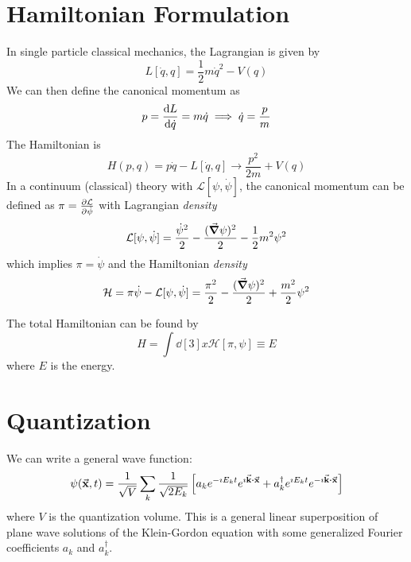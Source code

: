 \documentclass[a4paper,twoside,master.tex]{subfiles}
\begin{document}

\section{Hamiltonian Formulation}\label{sec:hamiltonian_formulation}

In single particle classical mechanics, the Lagrangian is given by
\begin{equation}
    L[\dot{q}, q] = \frac{1}{2} m\dot{q}^2 - V(q)
\end{equation}
We can then define the canonical momentum as
\begin{equation}
    p = \dv{L}{\dot{q}} = m \dot{q} \implies \dot{q} = \frac{p}{m}
\end{equation}
The Hamiltonian is
\begin{equation}
    H(p,q) = p \dot{q} - L[\dot{q}, q] \to \frac{p^2}{2m} + V(q)
\end{equation}
In a continuum (classical) theory with $ \mathcal{L}[\psi, \dot{\psi}] $, the canonical momentum can be defined as $ \pi = \pdv{\mathcal{L}}{\dot{\psi}} $ with Lagrangian \textit{density}
\begin{equation}
    \mathcal{L}[\psi, \dot{\psi}] = \frac{\dot{\psi}^2}{2} - \frac{(\grad{\psi})^2}{2} - \frac{1}{2} m^2 \psi^2
\end{equation}
which implies $ \pi = \dot{\psi} $ and the Hamiltonian \textit{density}
\begin{equation}
    \mathcal{H} = \pi \dot{\psi} - \mathcal{L}[\psi, \dot{\psi}] = \frac{\pi^2}{2} - \frac{(\grad{\psi})^2}{2} + \frac{m^2}{2} \psi^2
\end{equation}

The total Hamiltonian can be found by
\begin{equation}
    H = \int \dd[3]{x} \mathcal{H}[\pi, \psi] \equiv E
\end{equation}
where $ E $ is the energy.

\section{Quantization}\label{sec:quantization}

We can write a general wave function:
\begin{equation}
    \psi(\va{x}, t) = \frac{1}{\sqrt{V}} \sum_k \frac{1}{\sqrt{2 E_k}} \left[ a_k e^{- \imath E_k t} e^{\imath \va{k} \vdot \va{x}} + a^\dagger_k e^{\imath E_k t} e^{- \imath \va{k} \vdot \va{x}} \right]
\end{equation}
where $ V $ is the quantization volume. This is a general linear superposition of plane wave solutions of the Klein-Gordon equation with some generalized Fourier coefficients $ a_k $ and $ a^\dagger_k $.
\end{document}
